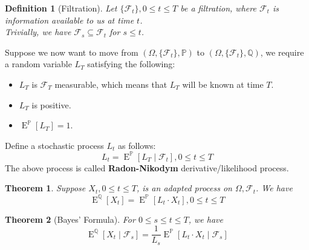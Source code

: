 \documentclass[12pt]{article}
\newtheorem{definition}{Definition}[section]
\newtheorem{theorem}{Theorem}[section]
\theoremstyle{definition}
\DeclareMathOperator{\expec}{E}
\begin{document}
\begin{definition}[Filtration]
\normalfont Let $\{\mathcal{F}_t\}, 0\leq t\leq T$ be a filtration, where $\mathcal{F}_t$ is information available to us at time $t$.\\
Trivially, we have $\mathcal{F}_s\subseteq \mathcal{F}_t$ for $s\leq t$.
\end{definition}
Suppose we now want to move from $(\Omega, \{\mathcal{F}_t\}, \mathbb{P})$ to $(\Omega, \{\mathcal{F}_t\}, \mathbb{Q})$, we require a random variable $L_T$ satisfying the following:
\begin{itemize}
  \item $L_T$ is $\mathcal{F}_T$ measurable, which means that $L_T$ will be known at time $T$.
  \item $L_T$ is positive.
  \item $\expec^\mathbb{P}[L_T]=1$.
\end{itemize}
Define a stochastic process $L_t$ as follows:
\[
L_t=\expec^\mathbb{P}[L_T\mid \mathcal{F}_t], 0\leq t\leq T
\]
The above process is called \textbf{Radon-Nikodym} derivative/likelihood process.
\begin{theorem}
\normalfont Suppose $X_t,0\leq t\leq T$, is an adapted process on $\Omega, \mathcal{F}_t$. We have
\[
\expec^\mathbb{Q}[X_t]=\expec^\mathbb{P}[L_t\cdot X_t], 0\leq t\leq T
\]
\end{theorem}
\begin{theorem}[Bayes' Formula]
\normalfont For $0\leq s\leq t\leq T$, we have
\[
\expec^\mathbb{Q}[X_t\mid \mathcal{F}_s]=\frac{1}{L_s}\expec^\mathbb{P}[L_t\cdot X_t\mid \mathcal{F}_s]
\]
\end{theorem}
\end{document}
